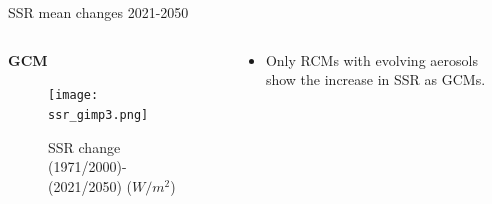 \documentclass{beamer}%
\begin{document}
\begin{frame}[fragile]{SSR mean changes 2021-2050}
\vspace{0.5\baselineskip}
\begin{columns}
  \begin{column}{0.7\textwidth}
 \hspace{1.8\baselineskip}\LARGE{\textbf{GCM}}
    \begin{figure}
      \texttt{[image: ssr\_gimp3.png]}
        \centering\caption{SSR change (1971/2000)-(2021/2050) ($W/m^2$)}
    \end{figure}
  \end{column}
  \begin{column}{0.4\textwidth}
    \begin{itemize}
      \centering\item Only RCMs with evolving aerosols show the increase in SSR as GCMs.
    \end{itemize}
  \end{column}
  \end{columns}
\end{frame}
 
\end{document}
